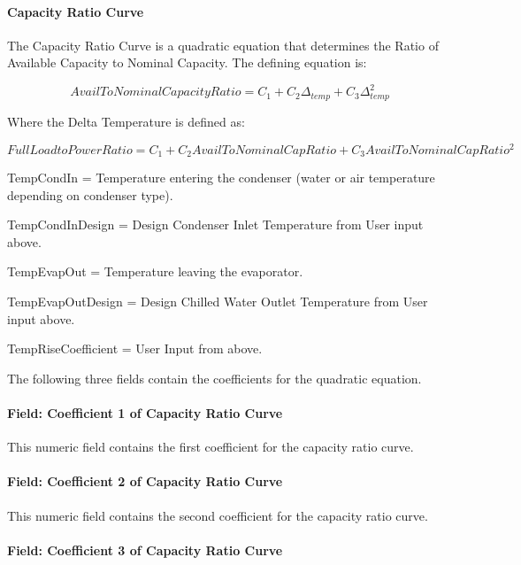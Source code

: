 \paragraph{Capacity Ratio Curve}\label{capacity-ratio-curve-2}

The Capacity Ratio Curve is a quadratic equation that determines the Ratio of Available Capacity to Nominal Capacity. The defining equation is:

\begin{equation}
AvailToNominalCapacityRatio = {C_1} + {C_2}{\Delta_{temp}} + {C_3}\Delta_{temp}^2
\end{equation}

Where the Delta Temperature is defined as:

\begin{equation}
FullLoadtoPowerRatio = {C_1} + {C_2}AvailToNominalCapRatio + {C_3}AvailToNominalCapRati{o^2}
\end{equation}

TempCondIn = Temperature entering the condenser (water or air temperature depending on condenser type).

TempCondInDesign = Design Condenser Inlet Temperature from User input above.

TempEvapOut = Temperature leaving the evaporator.

TempEvapOutDesign = Design Chilled Water Outlet Temperature from User input above.

TempRiseCoefficient = User Input from above.

The following three fields contain the coefficients for the quadratic equation.

\paragraph{Field: Coefficient 1 of Capacity Ratio Curve}\label{field-coefficient-1-of-capacity-ratio-curve-2}

This numeric field contains the first coefficient for the capacity ratio curve.

\paragraph{Field: Coefficient 2 of Capacity Ratio Curve}\label{field-coefficient-2-of-capacity-ratio-curve-2}

This numeric field contains the second coefficient for the capacity ratio curve.

\paragraph{Field: Coefficient 3 of Capacity Ratio Curve}\label{field-coefficient-3-of-capacity-ratio-curve-2}

